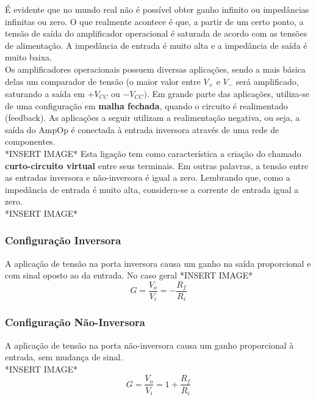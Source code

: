 \documentclass{article}
\numberwithin{equation}{section}
\begin{document}
    É evidente que no mundo real não é possível obter ganho infinito ou impedâncias infinitas ou zero. O que realmente acontece é que, a partir de um certo ponto, a tensão de saída do amplificador operacional é saturada de acordo com as tensões de alimentação. A impedância de entrada é muito alta e a impedância de saída é muito baixa. \\
    Os amplificadores operacionais possuem diversas aplicações, sendo a mais básica delas um comparador de tensão (o maior valor entre $V_{+}$ e $V_{-}$ será amplificado, saturando a saída em $+V_{CC}$ ou $-V_{CC})$. Em grande parte das aplicações, utiliza-se de uma configuração em \textbf{malha fechada}, quando o circuito é realimentado (feedback). As aplicações a seguir utilizam a realimentação negativa, ou seja, a saída do AmpOp é conectada à entrada inversora através de uma rede de componentes.\\
    *INSERT IMAGE*
    Esta ligação tem como característica a criação do chamado \textbf{curto-circuito virtual} entre seus terminais. Em outras palavras, a tensão entre as entradas inversora e não-inversora é igual a zero. Lembrando que, como a impedância de entrada é muito alta, considera-se a corrente de entrada igual a zero. \\
    *INSERT IMAGE*
    \subsubsection{Configuração Inversora}
    A aplicação de tensão na porta inversora causa um ganho na saída proporcional e com sinal oposto ao da entrada. No caso geral
    *INSERT IMAGE*
    \begin{equation}
        G=\frac{V_{o}}{V_{i}}=-\frac{R_{f}}{R_{i}}
    \end{equation}
    \subsubsection{Configuração Não-Inversora}
    A aplicação de tensão na porta não-inversora causa um ganho proporcional à entrada, sem mudança de sinal. \\
    *INSERT IMAGE*
    \begin{equation}
        G=\frac{V_{o}}{V_{i}}=1+\frac{R_{f}}{R_{i}}
    \end{equation}
\end{document}
